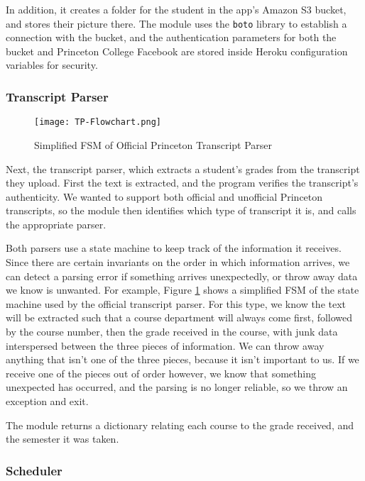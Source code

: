 In addition, it creates a folder for the student in the app's Amazon S3 bucket, and stores their picture there. The module uses the \texttt{boto} library to establish a connection with the bucket, and the authentication parameters for both the bucket and Princeton College Facebook are stored inside Heroku configuration variables for security.

\subsubsection{Transcript Parser}

\begin{figure}[!htbp]
    \centering
    \texttt{[image: TP-Flowchart.png]}
    \caption{Simplified FSM of Official Princeton Transcript Parser}
    \label{fig:tp-flowchart}
\end{figure}

Next, the transcript parser, which extracts a student's grades from the transcript they upload. First the text is extracted, and the program verifies the transcript's authenticity. We wanted to support both official and unofficial Princeton transcripts, so the module then identifies which type of transcript it is, and calls the appropriate parser.

Both parsers use a state machine to keep track of the information it receives. Since there are certain invariants on the order in which information arrives, we can detect a parsing error if something arrives unexpectedly, or throw away data we know is unwanted. For example, Figure \ref{fig:tp-flowchart} shows a simplified FSM of the state machine used by the official transcript parser. For this type, we know the text will be extracted such that a course department will always come first, followed by the course number, then the grade received in the course, with junk data interspersed between the three pieces of information. We can throw away anything that isn't one of the three pieces, because it isn't important to us. If we receive one of the pieces out of order however, we know that something unexpected has occurred, and the parsing is no longer reliable, so we throw an exception and exit.

The module returns a dictionary relating each course to the grade received, and the semester it was taken.

\subsubsection{Scheduler}


